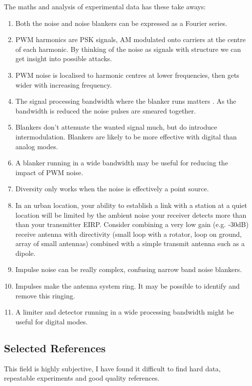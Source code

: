 \documentclass{article}
\begin{document}
The maths and analysis of experimental data has these take aways:
\begin{enumerate}
\item Both the noise and noise blankers can be expressed as a Fourier series.
\item PWM harmonics are PSK signals, AM modulated onto carriers at the centre of each harmonic.  By thinking of the noise as signals with structure we can get insight into possible attacks.
\item PWM noise is localised to harmonic centres at lower frequencies, then gets wider with increasing frequency.
\item The signal processing bandwidth where the blanker runs matters \cite{sm5bsz_blanker}.  As the bandwidth is reduced the noise pulses are smeared together.
\item Blankers don't attenuate the wanted signal much, but do introduce intermodulation.  Blankers are likely to be more effective with digital than analog modes.
\item A blanker running in a wide bandwidth may be useful for reducing the impact of PWM noise.
\item Diversity only works when the noise is effectively a point source.
\item In an urban location, your ability to establish a link with a station at a quiet location will be limited by the ambient noise your receiver detects more than than your transmitter EIRP.  Consider combining a very low gain (e.g. -30dB) receive antenna with directivity (small loop with a rotator, loop on ground, array of small antennas) combined with a simple transmit antenna such as a dipole.
\item Impulse noise can be really complex, confusing narrow band noise blankers.
\item Impulses make the antenna system ring. It may be possible to identify and remove this ringing.
\item A limiter and detector running in a wide processing bandwidth might be useful for digital modes.
\end{enumerate}

\subsection{Selected References}

This field is highly subjective, I have found it difficult to find hard data, repeatable experiments and good quality references.
\end{document}

